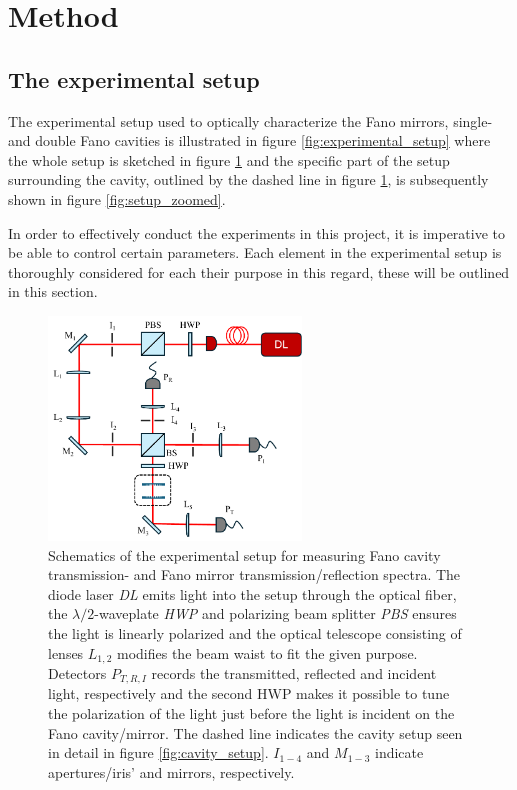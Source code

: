 \section{Method}
\subsection{The experimental setup}

The experimental setup used to optically characterize the Fano mirrors, single- and double Fano cavities is illustrated in figure \ref{fig:experimental_setup} where the whole setup is sketched in figure \ref{fig:setup_sketch} and the specific part of the setup surrounding the cavity, outlined by the dashed line in figure \ref{fig:setup_sketch}, is subsequently shown in figure \ref{fig:setup_zoomed}. 

In order to effectively conduct the experiments in this project, it is imperative to be able to control certain parameters. Each element in the experimental setup is thoroughly considered for each their purpose in this regard, these will be outlined in this section. 

\begin{figure}[h!]
    \centering
    \includegraphics[width=0.6\textwidth]{figures/setup_sketch.pdf}
    \caption{Schematics of the experimental setup for measuring Fano cavity transmission- and Fano mirror transmission/reflection spectra. The diode laser \emph{DL} emits light into the setup through the optical fiber, the $\lambda/2$-waveplate \emph{HWP} and polarizing beam splitter \emph{PBS} ensures the light is linearly polarized and the optical telescope consisting of lenses $L_{1,2}$ modifies the beam waist to fit the given purpose. Detectors $P_{T,R,I}$ records the transmitted, reflected and incident light, respectively and the second HWP makes it possible to tune the polarization of the light just before the light is incident on the Fano cavity/mirror. The dashed line indicates the cavity setup seen in detail in figure \ref{fig:cavity_setup}. $I_{1-4}$ and $M_{1-3}$ indicate apertures/iris' and mirrors, respectively.}
    \label{fig:setup_sketch}
\end{figure}

